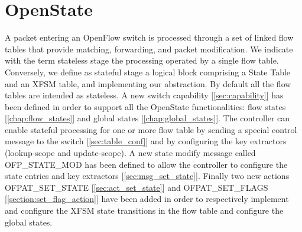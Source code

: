 \chapter{OpenState}
A packet entering an OpenFlow switch is processed through a set of linked flow tables that provide matching, forwarding, and packet modification.
We indicate with the term stateless stage the processing operated by a single flow table. Conversely, we define as stateful stage a logical block comprising a State Table and an XFSM table, and implementing our abstraction.
By default all the flow tables are intended as stateless. A new switch capability [\ref{sec:capability}] has been defined in order to support all the OpenState functionalities: flow states [\ref{chap:flow_states}] and global states [\ref{chap:global_states}]. The controller can enable stateful processing for one or more flow table by sending a special control message to the switch [\ref{sec:table_conf}] and by configuring the key extractors (lookup-scope and update-scope). A new state modify message called OFP\_STATE\_MOD has been defined to allow the controller to configure the state entries and key extractors [\ref{sec:msg_set_state}].
Finally two new actions OFPAT\_SET\_STATE [\ref{sec:act_set_state}] and OFPAT\_SET\_FLAGS [\ref{section:set_flag_action}] have been added in order to respectively implement and configure the XFSM state transitions in the flow table and configure the global states.